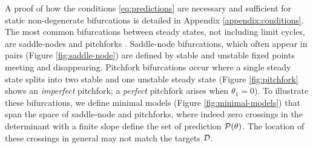 \documentclass{article}
\begin{document}
A proof of how the conditions \eqref{eq:predictions} are necessary and sufficient for static non-degenerate bifurcations is detailed in Appendix \ref{appendix:conditions}. The most common bifurcations between steady states, not including limit cycles, are saddle-nodes and pitchforks \cite{Haragus2011LocalSystems}. Saddle-node bifurcations, which often appear in pairs (Figure \ref{fig:saddle-node}) are defined by stable and unstable fixed points meeting and disappearing. Pitchfork bifurcations occur where a single steady state splits into two stable and one unstable steady state (Figure \ref{fig:pitchfork} shows an \textit{imperfect} pitchfork; a \textit{perfect} pitchfork arises when $\theta_1=0$). To illustrate these bifurcations, we define minimal models (Figure \ref{fig:minimal-models}) that span the space of saddle-node and pitchforks, where indeed zero crossings in the determinant with a finite slope define the set of prediction $\mathcal{P}(\theta)$. The location of these crossings in general may not match the targets $\mathcal{D}$.
\end{document}
